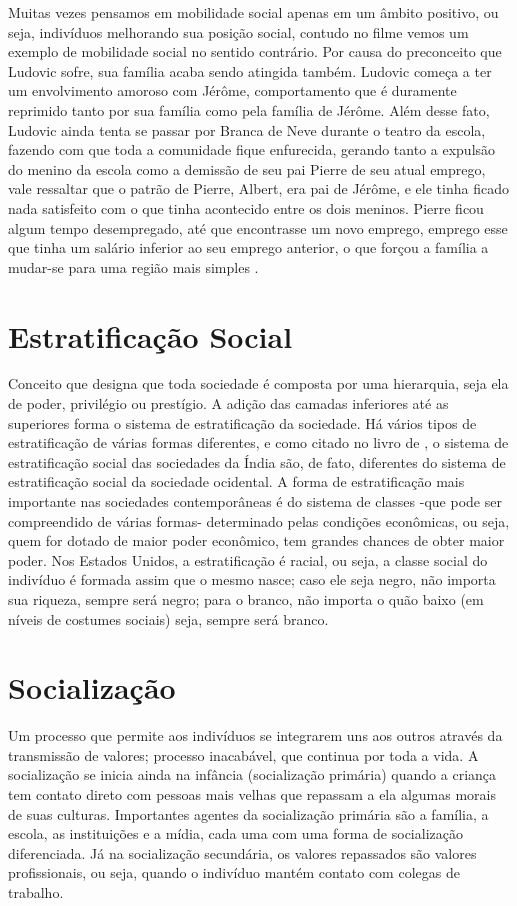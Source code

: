 \documentclass[
	12pt,				%
	openany,
	oneside,			%
	a4paper,			%
	chapter=TITLE,		%
	english,			%
	brazil				%
]{abntex2}
\begin{document}
Muitas vezes pensamos em mobilidade social apenas em um âmbito positivo, ou seja, indivíduos melhorando sua posição social, contudo no filme vemos um exemplo de mobilidade social no sentido contrário. Por causa do preconceito que Ludovic sofre, sua família acaba sendo atingida também. Ludovic começa a ter um envolvimento amoroso com Jérôme, comportamento que é duramente reprimido tanto por sua família como pela família de Jérôme. Além desse fato, Ludovic ainda tenta se passar por Branca de Neve durante o teatro da escola, fazendo com que toda a comunidade fique enfurecida, gerando tanto a expulsão do menino da escola como a demissão de seu pai Pierre de seu atual emprego, vale ressaltar que o patrão de Pierre, Albert, era pai de Jérôme, e ele tinha ficado nada satisfeito com o que tinha acontecido entre os dois meninos. Pierre ficou algum tempo desempregado, até que encontrasse um novo emprego, emprego esse que tinha um salário inferior ao seu emprego anterior, o que forçou a família a mudar-se para uma região mais simples \cite{minhaVidaEmCorDeRosa}.

\chapter{Estratificação Social}
Conceito que designa que toda sociedade é composta por uma hierarquia, seja ela de poder, privilégio ou prestígio. A adição das camadas inferiores até as superiores forma o sistema de estratificação da sociedade. Há vários tipos de estratificação de várias formas diferentes, e como citado no livro de , o sistema de estratificação social das sociedades da Índia são, de fato, diferentes do sistema de estratificação social da sociedade ocidental. A forma de estratificação mais importante nas sociedades contemporâneas é do sistema de classes -que pode ser compreendido de várias formas- determinado pelas condições econômicas, ou seja, quem for dotado de maior poder econômico, tem grandes chances de obter maior poder. Nos Estados Unidos, a estratificação é racial, ou seja, a classe social do indivíduo é formada assim que o mesmo nasce; caso ele seja negro, não importa sua riqueza, sempre será negro; para o branco, não importa o quão baixo (em níveis de costumes sociais) seja, sempre será branco.

\chapter{Socialização}
Um processo que permite aos indivíduos se integrarem uns aos outros através da transmissão de valores; processo inacabável, que continua por toda a vida. A socialização se inicia ainda na infância (socialização primária) quando a criança tem contato direto com pessoas mais velhas que repassam a ela algumas morais de suas culturas. Importantes agentes da socialização primária são a família, a escola, as instituições e a mídia, cada uma com uma forma de socialização diferenciada. Já na socialização secundária, os valores repassados são valores profissionais, ou seja, quando o indivíduo mantém contato com colegas de trabalho.
\end{document}
